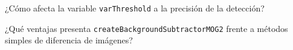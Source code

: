\vspace{5mm}
\begin{tcolorbox}[colback=gray!10, colframe=gray!30, coltitle=black, title=Pregunta A.1, halign=left]
¿Cómo afecta la variable \texttt{varThreshold} a la precisión de la detección?
\end{tcolorbox}

\vspace{5mm}
\begin{tcolorbox}[colback=gray!10, colframe=gray!30, coltitle=black, title=Pregunta A.2, halign=left]
¿Qué ventajas presenta \texttt{createBackgroundSubtractorMOG2} frente a métodos simples de diferencia de imágenes?
\end{tcolorbox}